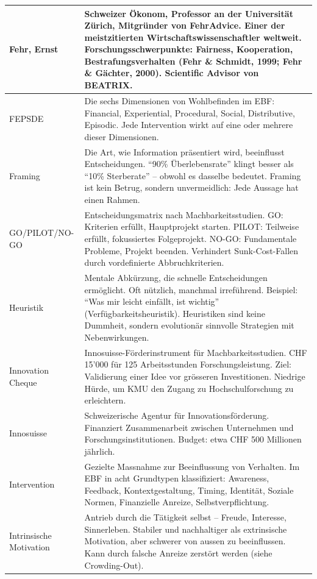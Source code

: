 \documentclass[11pt,a4paper]{article}
\begin{document}
\begin{longtable}{@{}L{4cm}L{10cm}@{}}
\midrule
Fehr, Ernst & Schweizer Ökonom, Professor an der Universität Zürich, Mitgründer von FehrAdvice. Einer der meistzitierten Wirtschaftswissenschaftler weltweit. Forschungsschwerpunkte: Fairness, Kooperation, Bestrafungsverhalten (Fehr \& Schmidt, 1999; Fehr \& Gächter, 2000). Scientific Advisor von BEATRIX. \\
\midrule
FEPSDE & Die sechs Dimensionen von Wohlbefinden im EBF: Financial, Experiential, Procedural, Social, Distributive, Episodic. Jede Intervention wirkt auf eine oder mehrere dieser Dimensionen. \\
\midrule
Framing & Die Art, wie Information präsentiert wird, beeinflusst Entscheidungen. ``90\% Überlebensrate'' klingt besser als ``10\% Sterberate'' -- obwohl es dasselbe bedeutet. Framing ist kein Betrug, sondern unvermeidlich: Jede Aussage hat einen Rahmen. \\
\midrule
GO/PILOT/NO-GO & Entscheidungsmatrix nach Machbarkeitsstudien. GO: Kriterien erfüllt, Hauptprojekt starten. PILOT: Teilweise erfüllt, fokussiertes Folgeprojekt. NO-GO: Fundamentale Probleme, Projekt beenden. Verhindert Sunk-Cost-Fallen durch vordefinierte Abbruchkriterien. \\
\midrule
Heuristik & Mentale Abkürzung, die schnelle Entscheidungen ermöglicht. Oft nützlich, manchmal irreführend. Beispiel: ``Was mir leicht einfällt, ist wichtig'' (Verfügbarkeitsheuristik). Heuristiken sind keine Dummheit, sondern evolutionär sinnvolle Strategien mit Nebenwirkungen. \\
\midrule
Innovation Cheque & Innosuisse-Förderinstrument für Machbarkeitsstudien. CHF 15'000 für 125 Arbeitsstunden Forschungsleistung. Ziel: Validierung einer Idee vor grösseren Investitionen. Niedrige Hürde, um KMU den Zugang zu Hochschulforschung zu erleichtern. \\
\midrule
Innosuisse & Schweizerische Agentur für Innovationsförderung. Finanziert Zusammenarbeit zwischen Unternehmen und Forschungsinstitutionen. Budget: etwa CHF 500 Millionen jährlich. \\
\midrule
Intervention & Gezielte Massnahme zur Beeinflussung von Verhalten. Im EBF in acht Grundtypen klassifiziert: Awareness, Feedback, Kontextgestaltung, Timing, Identität, Soziale Normen, Finanzielle Anreize, Selbstverpflichtung. \\
\midrule
Intrinsische Motivation & Antrieb durch die Tätigkeit selbst -- Freude, Interesse, Sinnerleben. Stabiler und nachhaltiger als extrinsische Motivation, aber schwerer von aussen zu beeinflussen. Kann durch falsche Anreize zerstört werden (siehe Crowding-Out). \\

\end{longtable}
\end{document}
